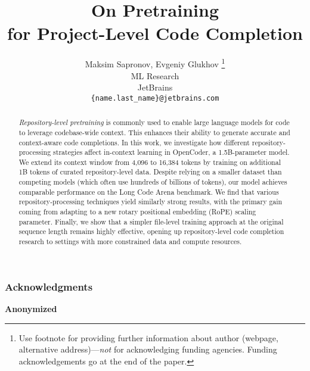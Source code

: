 \documentclass{article} %
\title{On Pretraining \\ for Project-Level Code Completion}
\author{Maksim Sapronov, Evgeniy Glukhov \thanks{ Use footnote for providing further information
about author (webpage, alternative address)---\emph{not} for acknowledging
funding agencies.  Funding acknowledgements go at the end of the paper.} \\
ML Research\\
JetBrains\\
\texttt{\{name.last\_name\}@jetbrains.com} 
}
\begin{document}
\maketitle

\begin{abstract}
\textit{Repository-level pretraining} is commonly used to enable large language models for code to leverage codebase-wide context. This enhances their ability to generate accurate and context-aware code completions. In this work, we investigate how different repository-processing strategies affect in-context learning in OpenCoder, a 1.5B-parameter model. We extend its context window from 4,096 to 16,384 tokens by training on additional 1B tokens of curated repository-level data. Despite relying on a smaller dataset than competing models (which often use hundreds of billions of tokens), our model achieves comparable performance on the Long Code Arena benchmark. We find that various repository-processing techniques yield similarly strong results, with the primary gain coming from adapting to a new rotary positional embedding (RoPE) scaling parameter. Finally, we show that a simpler file-level training approach at the original sequence length remains highly effective, opening up repository-level code completion research to settings with more constrained data and compute resources.
\end{abstract}








\subsubsection*{Acknowledgments}
\textbf{Anonymized}




\newpage
\appendix









\end{document}
